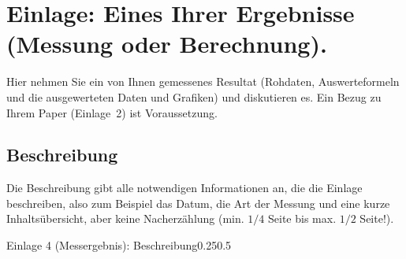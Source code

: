 \section{Einlage: Eines Ihrer Ergebnisse (Messung oder Berechnung).}
\label{sec:messergebnis}

\begin{hinweise}
Hier nehmen Sie ein von Ihnen gemessenes Resultat (Rohdaten, Auswerteformeln und die ausgewerteten Daten und
Grafiken) und diskutieren es. Ein Bezug zu Ihrem Paper (Einlage~2) ist Voraussetzung.
\end{hinweise}

\subsection{Beschreibung}
\begin{hinweise}
Die Beschreibung gibt alle notwendigen Informationen an, die die Einlage beschreiben, also zum Beispiel das
Datum, die Art der Messung und eine kurze Inhaltsübersicht, aber keine Nacherzählung (min. $1/4$ Seite bis
max. $1/2$ Seite!).
\end{hinweise}
\begin{umfang}{Einlage 4 (Messergebnis): Beschreibung}{0.25}{0.5}
\end{umfang}

